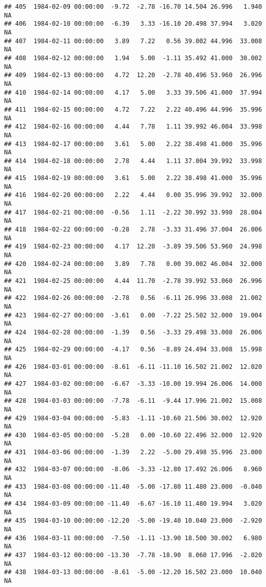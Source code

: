\documentclass{article}\usepackage{graphicx, color}
\makeatletter
\newenvironment{kframe}{%
 \def\at@end@of@kframe{}%
 \ifinner\ifhmode%
  \def\at@end@of@kframe{\end{minipage}}%
  \begin{minipage}{\columnwidth}%
 \fi\fi%
 \def\FrameCommand##1{\hskip\@totalleftmargin \hskip-\fboxsep
 \colorbox{shadecolor}{##1}\hskip-\fboxsep
     \hskip-\linewidth \hskip-\@totalleftmargin \hskip\columnwidth}%
 \MakeFramed {\advance\hsize-\width
   \@totalleftmargin\z@ \linewidth\hsize
   \@setminipage}}%
 {\par\unskip\endMakeFramed%
 \at@end@of@kframe}
\newenvironment{knitrout}{}{} %
\makeatother
\begin{document}
\begin{knitrout}
\begin{kframe}
\begin{verbatim}
## 405  1984-02-09 00:00:00  -9.72  -2.78 -16.70 14.504 26.996   1.940     NA
## 406  1984-02-10 00:00:00  -6.39   3.33 -16.10 20.498 37.994   3.020     NA
## 407  1984-02-11 00:00:00   3.89   7.22   0.56 39.002 44.996  33.008     NA
## 408  1984-02-12 00:00:00   1.94   5.00  -1.11 35.492 41.000  30.002     NA
## 409  1984-02-13 00:00:00   4.72  12.20  -2.78 40.496 53.960  26.996     NA
## 410  1984-02-14 00:00:00   4.17   5.00   3.33 39.506 41.000  37.994     NA
## 411  1984-02-15 00:00:00   4.72   7.22   2.22 40.496 44.996  35.996     NA
## 412  1984-02-16 00:00:00   4.44   7.78   1.11 39.992 46.004  33.998     NA
## 413  1984-02-17 00:00:00   3.61   5.00   2.22 38.498 41.000  35.996     NA
## 414  1984-02-18 00:00:00   2.78   4.44   1.11 37.004 39.992  33.998     NA
## 415  1984-02-19 00:00:00   3.61   5.00   2.22 38.498 41.000  35.996     NA
## 416  1984-02-20 00:00:00   2.22   4.44   0.00 35.996 39.992  32.000     NA
## 417  1984-02-21 00:00:00  -0.56   1.11  -2.22 30.992 33.998  28.004     NA
## 418  1984-02-22 00:00:00  -0.28   2.78  -3.33 31.496 37.004  26.006     NA
## 419  1984-02-23 00:00:00   4.17  12.20  -3.89 39.506 53.960  24.998     NA
## 420  1984-02-24 00:00:00   3.89   7.78   0.00 39.002 46.004  32.000     NA
## 421  1984-02-25 00:00:00   4.44  11.70  -2.78 39.992 53.060  26.996     NA
## 422  1984-02-26 00:00:00  -2.78   0.56  -6.11 26.996 33.008  21.002     NA
## 423  1984-02-27 00:00:00  -3.61   0.00  -7.22 25.502 32.000  19.004     NA
## 424  1984-02-28 00:00:00  -1.39   0.56  -3.33 29.498 33.008  26.006     NA
## 425  1984-02-29 00:00:00  -4.17   0.56  -8.89 24.494 33.008  15.998     NA
## 426  1984-03-01 00:00:00  -8.61  -6.11 -11.10 16.502 21.002  12.020     NA
## 427  1984-03-02 00:00:00  -6.67  -3.33 -10.00 19.994 26.006  14.000     NA
## 428  1984-03-03 00:00:00  -7.78  -6.11  -9.44 17.996 21.002  15.008     NA
## 429  1984-03-04 00:00:00  -5.83  -1.11 -10.60 21.506 30.002  12.920     NA
## 430  1984-03-05 00:00:00  -5.28   0.00 -10.60 22.496 32.000  12.920     NA
## 431  1984-03-06 00:00:00  -1.39   2.22  -5.00 29.498 35.996  23.000     NA
## 432  1984-03-07 00:00:00  -8.06  -3.33 -12.80 17.492 26.006   8.960     NA
## 433  1984-03-08 00:00:00 -11.40  -5.00 -17.80 11.480 23.000  -0.040     NA
## 434  1984-03-09 00:00:00 -11.40  -6.67 -16.10 11.480 19.994   3.020     NA
## 435  1984-03-10 00:00:00 -12.20  -5.00 -19.40 10.040 23.000  -2.920     NA
## 436  1984-03-11 00:00:00  -7.50  -1.11 -13.90 18.500 30.002   6.980     NA
## 437  1984-03-12 00:00:00 -13.30  -7.78 -18.90  8.060 17.996  -2.020     NA
## 438  1984-03-13 00:00:00  -8.61  -5.00 -12.20 16.502 23.000  10.040     NA

\end{verbatim}
\end{kframe}
\end{knitrout}
\end{document}
